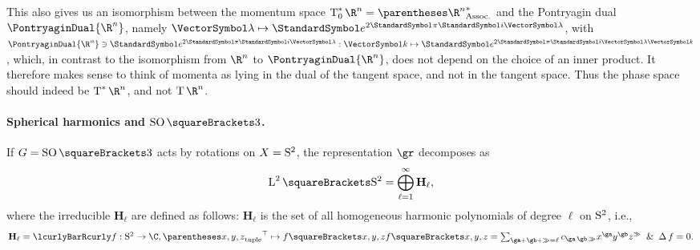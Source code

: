 \documentclass[10pt, a4paper, twoside]{lecturenotes}
\newcommand{\Rn}{{\R^n}}
\begin{document}
\begin{supplemental}
This also gives us an isomorphism between the momentum space $\CotangentSpace 0 \Rn = \Dual{\pa\Rn}$ and the Pontryagin dual $\PontryaginDual \Rn$, namely $\FunctionBody \vgl {\E^{2 \Pi \I \vgl }}$, with $\PontryaginDual \Rn\owns\FunctionNamedBody{\E^{2 \Pi \I \vgl}} \vk {\E^{2 \Pi \I \vgl\vk}}$, which, in contrast to the isomorphism from $\Rn$ to $\PontryaginDual\Rn$, does not depend on the choice of an inner product. It therefore makes sense to think of momenta as lying in the dual of the tangent space, and not in the tangent space. Thus the phase space should indeed be $\CotangentBundle \Rn$, and not $\TangentBundle \Rn$.

\paragraph{Spherical harmonics and $\SpecialOrthogonalGroup\of 3$.} 
\newcommand{\degL}{\ell}
\newcommand{\Harmonic}[1]{\mathbf{H}_{#1}}
If $G=\SpecialOrthogonalGroup\of 3$ acts by rotations on $X=\mathrm{S}^{2}$, the representation $\gr$ decomposes as 
\begin{equation*}
\Lspace[2]\of{\UnitSphere 2} = \DirectSum{\degL=1}[\infty] \Harmonic\degL\text{,}
\end{equation*}
where the irreducible $\Harmonic\degL$ are defined as follows: $\Harmonic\degL$ is the set of all homogeneous harmonic polynomials of degree $\degL$ on $\mathrm{S}^{2}$, i.e.,
\begin{equation*}
\Harmonic\degL = \setst{\FunctionSpec f {\UnitSphere 2} \C, \FunctionBody {\Transpose{\tuple{x,y,z}}} {f\of{x,y,z}}}{f\of{x,y,z} = \sum {\ga+\gb+\gg = \degL} c_{\ga\,\gb\,\gg} x^{\ga}y^{\gb}z^{\gg} \And \Laplacian f = 0  }\text{.}
\end{equation*}

\endgroup
\end{supplemental}
\end{document}
